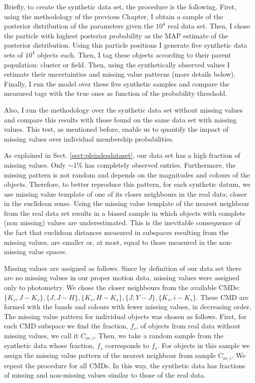 Briefly, to create the synthetic data set, the procedure is the following. First, using the methodology of the previous Chapter, I obtain a sample of the posterior distribution of the parameters given the $10^4$ real data set. Then, I chose the particle with highest posterior probability as the MAP estimate of the posterior distribution. Using this particle positions I generate five synthetic data sets of $10^4$ objects each. Then, I tag these objects according to their parent population: cluster or field. Then, using the synthetically observed values I estimate their uncertainties and missing value patterns (more details  below). Finally, I run the model over these five synthetic samples and compare the measured tags with the true ones as function of the probability threshold.

 Also, I run the methodology over the synthetic data set without missing values and compare this results with those found on the same data set with missing values. This test, as mentioned before, enable us to quantify the impact of missing values over individual membership probabilities.  

As explained in Sect. \ref{sect:pleiadesdataset}, our data set has a high fraction of missing values. Only $\sim1\%$ has completely observed entries. Furthermore, the missing pattern is not random and depends on the magnitudes and colours of the objects. Therefore, to better reproduce this pattern, for each synthetic datum, we use missing value template of one of its closer neighbours in the real data; closer in the euclidean sense. Using the missing value template of the nearest neighbour from the real data set results in a biased sample in which objects with complete (non missing) values are underestimated. This is the inevitable consequence of the fact that euclidean distances measured in subspaces resulting from the missing values, are smaller or, at most, equal to those measured in the non-missing value spaces. 

Missing values are assigned as follows. Since by definition of our data set there are no missing values in our proper motion data, missing values were assigned only to photometry. We chose the closer neighbours from the available CMDs: $\{K_s,J-K_s\},\{J,J-H\},\{K_s,H-K_s\},\{J,Y-J\},\{K_s,i-K_s\}$. These CMD are formed with the bands and colours with fewer missing values, in decreasing order.  The missing value pattern for individual objects was chosen as follows. First, for each CMD subspace we find the fraction, $f_r$, of objects from real data without missing values, we call it $C_{or,i}$. Then, we take a random sample from the synthetic data whose fraction, $f_s$ corresponds to $f_r$. For objects in this sample we assign the missing value pattern of the nearest neighbour from sample $C_{or,i}$. We repeat the procedure for all CMDs. In this way, the synthetic data has fractions of missing and non-missing values similar to those of the real data.

